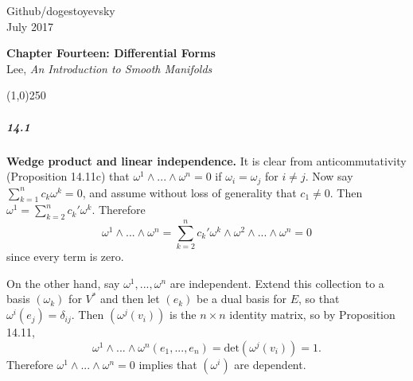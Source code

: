 \documentclass[10pt,letter]{article}
\begin{document}
\noindent Github/dogestoyevsky \\
July 2017
\begin{center}
\textbf{Chapter Fourteen: Differential Forms}\\ Lee, \textit{An Introduction to Smooth Manifolds}

\line(1,0){250}
\end{center}
\subparagraph*{14.1} {\bf Wedge product and linear independence.} It is clear from anticommutativity (Proposition 14.11c) that $\omega^1 \wedge ... \wedge \omega^n = 0$ if $\omega_i = \omega_j$ for $i \neq j$. Now say $\sum_{k=1}^n c_k \omega^k = 0$, and assume without loss of generality that $c_1 \neq 0$. Then $\omega^1 = \sum_{k=2}^n c_k' \omega^k$. Therefore 
\[ \omega^1 \wedge ... \wedge \omega^n = \sum_{k=2}^n c_k' \omega^k \wedge \omega^2  \wedge ... \wedge \omega^n = 0 \] since every term is zero. 

On the other hand, say $\omega^1,...,\omega^n$ are independent. Extend this collection to a basis $(\omega_k)$ for $V^{\ast}$ and then let $(e_k)$ be a dual basis for $E$, so that $\omega^i(e_j) = \delta_{ij}$. Then $(\omega^j(v_i))$ is the $n \times n$ identity matrix, so by Proposition 14.11, \[ \omega^1 \wedge ... \wedge \omega^n(e_1,...,e_n) = \text{det}(\omega^j(v_i)) = 1. \] Therefore $\omega^1 \wedge ... \wedge \omega^n = 0$ implies that $(\omega^i)$ are dependent. 
\end{document}
